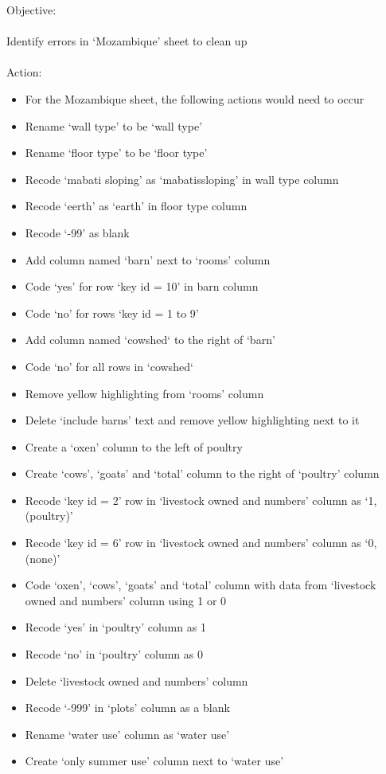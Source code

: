 \documentclass{article}
\begin{document}
Objective:\\\\ 
Identify errors in ‘Mozambique’ sheet to clean up\\\\
Action: 
\begin{itemize}
\item For the Mozambique sheet, the following actions would need to occur
\item Rename ‘wall type’ to be ‘wall type’
\item Rename ‘floor type’ to be ‘floor type’
\item Recode ‘mabati sloping’ as ‘mabatissloping’ in wall type column
\item Recode ‘eerth’ as ‘earth’ in floor type column
\item Recode ‘-99’ as blank
\item Add column named ‘barn’ next to ‘rooms’ column
\item Code ‘yes’ for row ‘key id = 10’ in barn column
\item Code ‘no’ for rows ‘key id = 1 to 9’
\item Add column named ‘cowshed‘ to the right of ‘barn’
\item Code ‘no’ for all rows in ‘cowshed‘
\item Remove yellow highlighting from ‘rooms’ column
\item Delete ‘include barns’ text and remove yellow highlighting next to it
\item Create a ‘oxen’ column to the left of poultry
\item Create ‘cows’, ‘goats’ and ‘total’ column to the right of ‘poultry’ column
\item Recode ‘key id = 2’ row in ‘livestock owned and numbers’ column as ‘1, (poultry)’
\item Recode ‘key id = 6’ row in ‘livestock owned and numbers’ column as ‘0, (none)’
\item Code ‘oxen’, ‘cows’, ‘goats’ and ‘total’ column with data from ‘livestock owned and numbers’ column using 1 or 0
\item Recode ‘yes’ in ‘poultry’ column as 1
\item Recode ‘no’ in ‘poultry’ column as 0
\item Delete ‘livestock owned and numbers’ column
\item Recode ‘-999’ in ‘plots’ column as a blank
\item Rename ‘water use’ column as ‘water use’
\item Create ‘only summer use’ column next to ‘water use’

\end{itemize}
\end{document}
